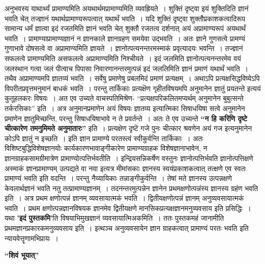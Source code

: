{अनुभवस्य याथार्थ्यं प्रामाण्यमिति अयथार्थमप्रामाण्यमिति व्यवह्रियते~। शुक्तिं दृष्ट्वा इयं शुक्तिदिति ज्ञानं भवति चेत् तज्ज्ञानं यथार्थप्रामाण्यरूपत्वात् यथार्थं भवति~। यदि शुक्तिं दृष्ट्वा शुक्तौप्रकाशकत्वादिरूप सामान्य धर्मं ज्ञात्वा इदं रजतमिति ज्ञानं भवति चेत् शुक्तौ रजतत्व दर्शनात् अयं अप्रामाण्यरूपं अयथार्थं भवति~। प्रामाण्याप्रामाण्यज्ञानं न ज्ञानकाले ज्ञानग्रहण समयेवा उद्भवति~। अतः ज्ञाने गुणसत्वे प्रामण्यं गुणाभावे दोषसत्वे वा अप्रामाण्यमिति ज्ञायते~। ज्ञानोत्पत्यनन्तरमस्माकं प्रवृत्यादयः भवन्ति~। तज्ज्ञानं सफलत्वे प्रामाण्यमिति असफलत्वे अप्रामाण्यमिति निश्चीयते~। इदं जलमिति ज्ञानोत्पत्यनन्तरमेव वयं जलस्थान गत्वा जलं पीत्वाच पिपासा निवारणानन्तरमुत्पन्नं इदं जललिमिति ज्ञानं प्रमाणं यथार्थं भवति~। तथैव अप्रामाण्यमपि ज्ञातव्यं भवति~। सर्वेषु प्रमाणेषु प्रबलमिदं प्रमाणं प्रत्यक्षम्~। अथाऽपि प्रत्यक्षसिद्धविष्येऽपि विपरीतप्रवृत्तमनुमानं बाधकं भवति~। परन्तु तार्किकाः प्रत्यक्षॆण गृहीतविषयमपि अनुमानेन ज्ञातुं प्रयतन्ते इत्ययं कुतूहलकरः विषयः~। अत एव उच्यते वाचस्पतिमिश्रॆण- “प्रत्यक्षपरिकलितमप्यर्थम् अनुमानेन बुबुत्सन्ते तर्करसिकाः” इति~। अत्र अनुमानप्रमाणेन अयं विषयः ज्ञातव्य इत्यात्मिका सिषाधयिषा सत्वे अनुमानेन प्रमाणेन ज्ञातुमिच्छन्ति, परन्तु सिषाधयिषाभावे न ते प्रवर्तन्ते~। अतः ते एव उच्यन्ते \textbf{“न हि करिणि दृष्टे चीत्कारेण तमनुमिमते अनुमातारः”} इति~। प्रत्यक्षेण दृष्टॆ गजे पुनः चीत्कार श्रवणेन अयं गज इत्यनुमानेन कोऽपि ज्ञातुं न इच्छति~। इति ज्ञान प्रामाण्ये परतस्त्वं स्वीकुर्वन्ति तार्किकाः~। अतः विशिष्टबुद्धिविशेषज्ञानयोः कार्यकारणभावाङ्गीकारेण प्रामाण्यग्राहक विशेषज्ञानाभावेन, न ज्ञानग्राहकसामग्रीमात्रेण प्रामाण्योत्पत्तिर्भवतीति~। इन्द्रियसन्निकर्षेण वस्तुनः ज्ञानोत्पत्तिर्भवति ज्ञानोत्पत्तिक्षणे अस्माकं ज्ञानप्रामाण्यम् उत्पद्यते वा नवा इत्यत्र मीमांसकाः ज्ञानस्य स्वयंप्रकाशकत्वात् तत्क्षणे एव स्वतः प्रामाण्यं भवति इति वदन्ति~। परन्तु नैय्यायिकाः तन्नाङ्गीकुर्वन्ति~। तेषां मते ज्ञानस्य उत्पन्नक्षणे केवलार्थज्ञानं भवति नतु तत्प्रामाण्यज्ञानम्~। तदनन्तरमुत्पन्नेन ज्ञानेन प्रथमक्षणोत्पन्नंस्य ज्ञानस्य ग्रहंण भवति इति~। अत्र प्रथम क्षणोत्पन्नं ज्ञानम् व्यवसायात्मकं भवति~। द्वितीयक्षणोत्पन्नं ज्ञानम् अनुव्यवसायात्मकं भवति~। प्रथम क्षणोत्पन्नज्ञानविषयक ज्ञानमेव द्वितीयक्षणे मानसिकप्रत्यक्षज्ञानमनुव्यवसाय इति प्रसिद्धिः~। यथा \textbf{’इदं पुस्तकमि’}ति विषयाभिमुखज्ञानं व्यवसायात्मिअकमिति~। ततः पुस्तकमहं जानामीति प्रथमज्ञानप्रकारकमनुव्यवसाय इति~। इत्थञ्च अनुव्यवसायेन ज्ञान ग्राहकत्वात् प्रामाण्यं परतः भवति इति न्यायवेत्तॄणामभिप्रायः~। 

\textbf{“शिवं भूयात्”}

}
